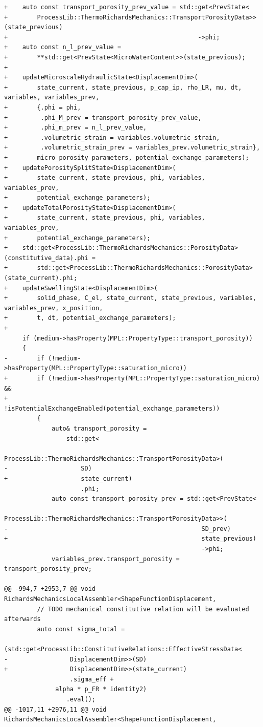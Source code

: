 \documentclass[10pt]{article}
\begin{document}
\begin{lstlisting}
+    auto const transport_porosity_prev_value = std::get<PrevState<
+        ProcessLib::ThermoRichardsMechanics::TransportPorosityData>>(state_previous)
+                                                    ->phi;
+    auto const n_l_prev_value =
+        **std::get<PrevState<MicroWaterContent>>(state_previous);
+
+    updateMicroscaleHydraulicState<DisplacementDim>(
+        state_current, state_previous, p_cap_ip, rho_LR, mu, dt, variables, variables_prev,
+        {.phi = phi,
+         .phi_M_prev = transport_porosity_prev_value,
+         .phi_m_prev = n_l_prev_value,
+         .volumetric_strain = variables.volumetric_strain,
+         .volumetric_strain_prev = variables_prev.volumetric_strain},
+        micro_porosity_parameters, potential_exchange_parameters);
+    updatePorositySplitState<DisplacementDim>(
+        state_current, state_previous, phi, variables, variables_prev,
+        potential_exchange_parameters);
+    updateTotalPorosityState<DisplacementDim>(
+        state_current, state_previous, phi, variables, variables_prev,
+        potential_exchange_parameters);
+    std::get<ProcessLib::ThermoRichardsMechanics::PorosityData>(constitutive_data).phi =
+        std::get<ProcessLib::ThermoRichardsMechanics::PorosityData>(state_current).phi;
+    updateSwellingState<DisplacementDim>(
+        solid_phase, C_el, state_current, state_previous, variables, variables_prev, x_position,
+        t, dt, potential_exchange_parameters);
+
     if (medium->hasProperty(MPL::PropertyType::transport_porosity))
     {
-        if (!medium->hasProperty(MPL::PropertyType::saturation_micro))
+        if (!medium->hasProperty(MPL::PropertyType::saturation_micro) &&
+            !isPotentialExchangeEnabled(potential_exchange_parameters))
         {
             auto& transport_porosity =
                 std::get<
                     ProcessLib::ThermoRichardsMechanics::TransportPorosityData>(
-                    SD)
+                    state_current)
                     .phi;
             auto const transport_porosity_prev = std::get<PrevState<
                 ProcessLib::ThermoRichardsMechanics::TransportPorosityData>>(
-                                                     SD_prev)
+                                                     state_previous)
                                                      ->phi;
             variables_prev.transport_porosity = transport_porosity_prev;
 
@@ -994,7 +2953,7 @@ void RichardsMechanicsLocalAssembler<ShapeFunctionDisplacement,
         // TODO mechanical constitutive relation will be evaluated afterwards
         auto const sigma_total =
             (std::get<ProcessLib::ConstitutiveRelations::EffectiveStressData<
-                 DisplacementDim>>(SD)
+                 DisplacementDim>>(state_current)
                  .sigma_eff +
              alpha * p_FR * identity2)
                 .eval();
@@ -1017,11 +2976,11 @@ void RichardsMechanicsLocalAssembler<ShapeFunctionDisplacement,
 

\end{lstlisting}
\end{document}
